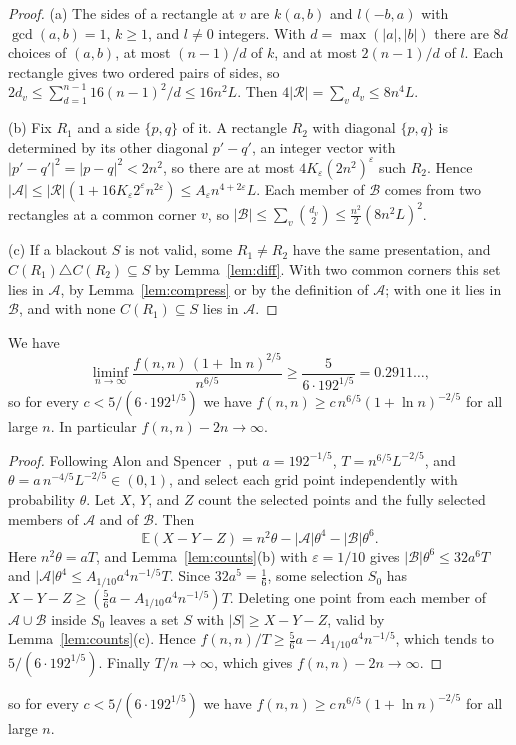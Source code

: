 \begin{proof}
(a) The sides of a rectangle at $v$ are $k(a,b)$ and $l(-b,a)$ with $\gcd(a,b)=1$, $k\ge1$, and $l\ne0$ integers. With $d=\max(|a|,|b|)$ there are $8d$ choices of $(a,b)$, at most $(n-1)/d$ of $k$, and at most $2(n-1)/d$ of $l$. Each rectangle gives two ordered pairs of sides, so $2d_v\le\sum_{d=1}^{n-1}16(n-1)^2/d\le16n^2L$. Then $4|\mathcal R|=\sum_vd_v\le8n^4L$.

(b) Fix $R_1$ and a side $\{p,q\}$ of it. A rectangle $R_2$ with diagonal $\{p,q\}$ is determined by its other diagonal $p'-q'$, an integer vector with $|p'-q'|^2=|p-q|^2<2n^2$, so there are at most $4K_\varepsilon(2n^2)^\varepsilon$ such $R_2$. Hence $|\mathcal A|\le|\mathcal R|(1+16K_\varepsilon2^\varepsilon n^{2\varepsilon})\le A_\varepsilon n^{4+2\varepsilon}L$. Each member of $\mathcal B$ comes from two rectangles at a common corner $v$, so $|\mathcal B|\le\sum_v\binom{d_v}2\le\frac{n^2}2(8n^2L)^2$.

(c) If a blackout $S$ is not valid, some $R_1\ne R_2$ have the same presentation, and $C(R_1)\triangle C(R_2)\subseteq S$ by Lemma~\ref{lem:diff}. With two common corners this set lies in $\mathcal A$, by Lemma~\ref{lem:compress} or by the definition of $\mathcal A$; with one it lies in $\mathcal B$, and with none $C(R_1)\subseteq S$ lies in $\mathcal A$.
\end{proof}

\begin{theorem}\label{thm:alteration}
We have
\[
\liminf_{n\to\infty}\frac{f(n,n)\,(1+\ln n)^{2/5}}{n^{6/5}}\ge\frac5{6\cdot192^{1/5}}=0.2911\ldots,
\]
so for every $c<5/(6\cdot192^{1/5})$ we have $f(n,n)\ge c\,n^{6/5}(1+\ln n)^{-2/5}$ for all large $n$. In particular $f(n,n)-2n\to\infty$.
\end{theorem}

\begin{proof}
Following Alon and Spencer~\cite[Section~3.2]{alonspencer2016}, put $a=192^{-1/5}$, $T=n^{6/5}L^{-2/5}$, and $\theta=a\,n^{-4/5}L^{-2/5}\in(0,1)$, and select each grid point independently with probability $\theta$. Let $X$, $Y$, and $Z$ count the selected points and the fully selected members of $\mathcal A$ and of $\mathcal B$. Then
\[
\mathbb E(X-Y-Z)=n^2\theta-|\mathcal A|\theta^4-|\mathcal B|\theta^6 .
\]
Here $n^2\theta=aT$, and Lemma~\ref{lem:counts}(b) with $\varepsilon=1/10$ gives $|\mathcal B|\theta^6\le32a^6T$ and $|\mathcal A|\theta^4\le A_{1/10}a^4n^{-1/5}T$. Since $32a^5=\frac16$, some selection $S_0$ has $X-Y-Z\ge(\frac56a-A_{1/10}a^4n^{-1/5})T$. Deleting one point from each member of $\mathcal A\cup\mathcal B$ inside $S_0$ leaves a set $S$ with $|S|\ge X-Y-Z$, valid by Lemma~\ref{lem:counts}(c). Hence $f(n,n)/T\ge\frac56a-A_{1/10}a^4n^{-1/5}$, which tends to $5/(6\cdot192^{1/5})$. Finally $T/n\to\infty$, which gives $f(n,n)-2n\to\infty$.
\end{proof}

so for every $c<5/(6\cdot192^{1/5})$ we have $f(n,n)\ge c\,n^{6/5}(1+\ln n)^{-2/5}$ for all large $n$.
